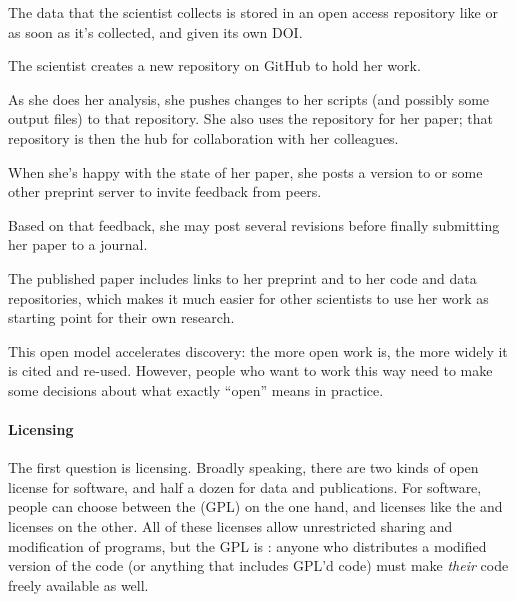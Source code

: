 \documentclass{book}
\begin{document}
\begin{swcitemize}
\item
  The data that the scientist collects is stored in an open access
  repository like  or
   as soon as it's collected, and
  given its own DOI.
\item
  The scientist creates a new repository on GitHub to hold her work.
\item
  As she does her analysis, she pushes changes to her scripts (and
  possibly some output files) to that repository. She also uses the
  repository for her paper; that repository is then the hub for
  collaboration with her colleagues.
\item
  When she's happy with the state of her paper, she posts a version to
   or some other preprint server to
  invite feedback from peers.
\item
  Based on that feedback, she may post several revisions before finally
  submitting her paper to a journal.
\item
  The published paper includes links to her preprint and to her code and
  data repositories, which makes it much easier for other scientists to
  use her work as starting point for their own research.
\end{swcitemize}

This open model accelerates discovery: the more open work is, the more
widely it is cited and re-used. However, people who want to work this
way need to make some decisions about what exactly ``open'' means in
practice.

\mbox{}\paragraph{Licensing}

The first question is licensing. Broadly speaking, there are two kinds
of open license for software, and half a dozen for data and
publications. For software, people can choose between the
 (GPL)
on the one hand, and licenses like the
 and
 licenses on the
other. All of these licenses allow unrestricted sharing and modification
of programs, but the GPL is :
anyone who distributes a modified version of the code (or anything that
includes GPL'd code) must make \emph{their} code freely available as
well.
\end{document}
